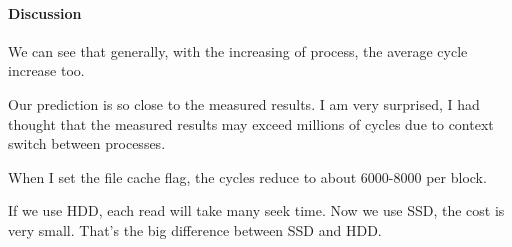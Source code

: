 \paragraph{Discussion}
We can see that generally, with the increasing of process, the average cycle increase too. 

Our prediction is so close to the measured results. I am very surprised, I had thought that the measured results may exceed millions of cycles due to context switch between processes.

When I set the file cache flag, the cycles reduce to about 6000-8000 per block.

If we use HDD, each read will take many seek time. Now we use SSD, the cost is very small. That's the big difference between SSD and HDD.